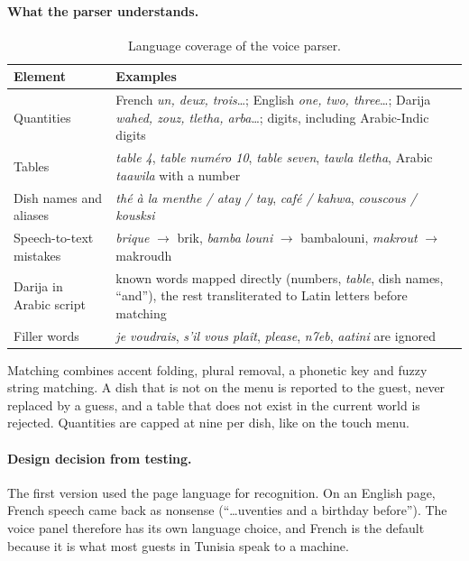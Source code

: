 \documentclass[11pt,a4paper]{article}
\begin{document}
\paragraph{What the parser understands.}
\begin{table}[H]
\centering
\small
\begin{tabularx}{\linewidth}{l L}
\toprule
\textbf{Element} & \textbf{Examples} \\
\midrule
Quantities & French \emph{un, deux, trois}\ldots; English \emph{one, two, three}\ldots; Darija \emph{wahed, zouz, tletha, arba}\ldots; digits, including Arabic-Indic digits \\
Tables & \emph{table 4}, \emph{table numéro 10}, \emph{table seven}, \emph{tawla tletha}, Arabic \emph{taawila} with a number \\
Dish names and aliases & \emph{thé à la menthe / atay / tay}, \emph{café / kahwa}, \emph{couscous / kousksi} \\
Speech-to-text mistakes & \emph{brique} $\rightarrow$ brik, \emph{bamba louni} $\rightarrow$ bambalouni, \emph{makrout} $\rightarrow$ makroudh \\
Darija in Arabic script & known words mapped directly (numbers, \emph{table}, dish names, ``and''), the rest transliterated to Latin letters before matching \\
Filler words & \emph{je voudrais}, \emph{s'il vous plaît}, \emph{please}, \emph{n7eb}, \emph{aatini} are ignored \\
\bottomrule
\end{tabularx}
\caption{Language coverage of the voice parser.}
\end{table}

Matching combines accent folding, plural removal, a phonetic key and fuzzy
string matching. A dish that is not on the menu is reported to the guest,
never replaced by a guess, and a table that does not exist in the current
world is rejected. Quantities are capped at nine per dish, like on the
touch menu.

\paragraph{Design decision from testing.} The first version used the page
language for recognition. On an English page, French speech came back as
nonsense (``\ldots uventies and a birthday before''). The voice panel
therefore has its own language choice, and French is the default because
it is what most guests in Tunisia speak to a machine.
\end{document}
